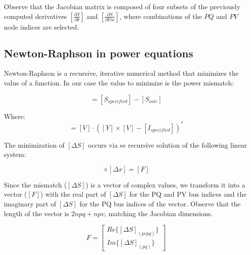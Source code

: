 \documentclass[nols,a4paper,twoside,notoc,fleqn]{tufte-book}
\begin{document}
Observe that the Jacobian matrix is composed of four subsets of the previously computed derivatives $\left[\frac{\partial S}{\partial \theta}\right]$ and $\left[\frac{\partial S}{\partial Vm}\right]$, where combinations of the $PQ$ and $PV$ node indices are selected.


\newpage
\subsection{Newton-Raphson in power equations} \label{NR-Method}

Newton-Raphson is a recursive, iterative numerical method that minimizes the value of a function. In our case the value to minimize is the power mismatch:

\begin{equation}
[\Delta S] = [S_{specified}] - [S_{calc} ]
\end{equation}

Where:
\begin{equation}
[S_{calc}] = [V] \cdot ([Y] \times [V] - [I_{specified}])^*
\label{eq:nr_Scalc}
\end{equation}

The minimization of $[\Delta S]$ occurs via se recursive solution of the following linear system:

\begin{equation}
[J] \times [\Delta x] = [F]
\end{equation}

Since the mismatch ($[\Delta S]$) is a vector of complex values, we transform it into a vector ($[F]$) with the real part of $[\Delta S]$ for the PQ and PV bus indices and the imaginary part of $[\Delta S]$ for the PQ bus indices of the vector. Observe that the length of the vector is $2npq+npv$, matching the Jacobian dimensions.



\begin{equation}
F =  \left[
\begin{array}{c}
Re \{ [\Delta S]_{(pvpq)}  \} \\
Im \{ [\Delta S]_{(pq)} \} 
\end{array}
\right]
\label{eq:nr_mismatch}
\end{equation}

%
\end{document}
